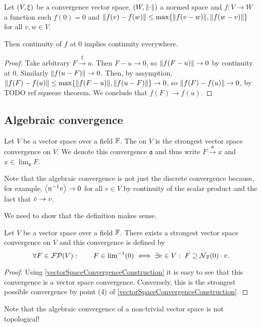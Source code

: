 \begin{lemma} \label{superSubtractiveContinuityEverywhere}
Let $\left( V, \xi \right)$ be a convergence vector space, $\left( W, \lVert\cdot\rVert \right)$ a normed space and $f: V\to W$ a function such $f(0) = 0$ and $\lVert f(v) - f(w)\rVert \leq \max\{\lVert f(v-w)\rVert, \lVert f(w-v)\rVert\}$ for all $v,w\in V$.

Then continuity of $f$ at $0$ implies continuity everywhere.
\end{lemma}
\begin{proof}
Take arbitrary $F\overset{\xi}{\longrightarrow} u$. Then $F-u \to 0$, so $\lVert f(F-u)\rVert\to 0$ by continuity at $0$. Similarly $\lVert f(u-F)\rVert\to 0$. Then, by assymption, $\lVert f(F) - f(u)\rVert \leq \max\{\lVert f(F-u)\rVert, \lVert f(u-F)\rVert\} \to 0$, so $\lVert f(F) - f(u)\rVert \to 0$, by TODO ref squeeze theorem. We conclude that $f(F)\to f(u)$.
\end{proof}

\subsection{Algebraic convergence}
\begin{definition}
Let $V$ be a vector space over a field $\mathbb{F}$. The  on $V$ is the strongest vector space convergence on $V$. We denote this convergence $\mathfrak{a}$ and thus write $F \overset{\mathfrak{a}}{\longrightarrow} x$ and $x\in \lim_\mathfrak{a} F$.
\end{definition}
Note that the algebraic convergence is not just the discrete convergence because, for example, $\left\langle n^{-1}v \right\rangle \to 0$ for all $v\in V$ by continuity of the scalar product and the fact that $\dot{v} \to v$.


We need to show that the definition makes sense.
\begin{proposition} \label{algebraicConvergence}
Let $V$ be a vector space over a field $\mathbb{F}$. There exists a strongest vector space convergence on $V$ and this convergence is defined by
\[ \forall F\in \operatorname{\mathcal{FP}}(V): \qquad F\in {\lim}^{-1}(0) \iff \exists v\in V: \;F \supseteq \operatorname{\mathcal{N}}_{\mathbb{F}}(0)\cdot v.  \]
\end{proposition}
\begin{proof}
Using \ref{vectorSpaceConvergenceConstruction} it is easy to see that this convergence is a vector space convergence. Conversely, this is the strongest possible convergence by point (4) of \ref{vectorSpaceConvergenceConstruction}.
\end{proof}
Note that the algebraic convergence of a non-trivial vector space is not topological!

